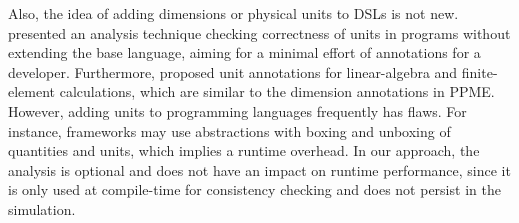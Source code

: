 Also, the idea of adding dimensions or physical units to DSLs is not new.
\cite{Cook2006} presented an analysis technique checking correctness of 
units in programs without extending the base language, aiming for a minimal effort of 
annotations for a developer. Furthermore, \cite{Austin2006} proposed unit annotations 
for linear-algebra and finite-element calculations, which are similar to the dimension annotations
in PPME.
%
However, adding units to programming languages frequently has flaws. 
For instance, frameworks may use abstractions with boxing and unboxing of 
quantities and units, which implies a runtime overhead.
In our approach, the analysis is optional and does not have an impact on runtime 
performance, since it is only used at compile-time for consistency checking and does not persist in the simulation. 

